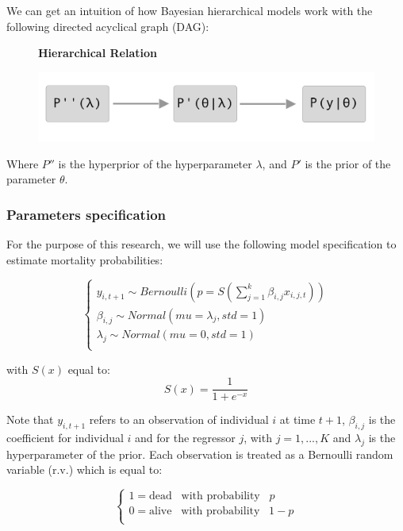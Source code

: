 We can get an intuition of how Bayesian hierarchical models work with the following directed acyclical graph (DAG):\\

\begin{figure}[H]
\centering \textbf{Hierarchical Relation} \par\medskip
\includegraphics[width=0.5\linewidth]{images/hierarchical_relation.png}
\end{figure}

Where $P''$ is the hyperprior of the hyperparameter $\lambda$, and $P'$ is the prior of the parameter $\theta$.

\subsubsection{Parameters specification}\label{hierarchical_model}

For the purpose of this research, we will use the following model specification to estimate mortality probabilities:

\begin{equation}
    \begin{cases}
     y_{i,t+1} \sim Bernoulli(p=S(\sum_{j=1}^{k}\beta_{i,j} x_{i,j,t}))  \\
 \beta_{i,j} \sim Normal(mu=\lambda_j, std=1) \\
\lambda_j \sim Normal(mu=0, std=1) \\
    \end{cases}
\end{equation}

with $S(x)$ equal to:
\begin{equation}
     S(x) = \frac{1}{1+e^{-x}}
\end{equation}

Note that $ y_{i,t+1} $ refers to an observation of individual $i$ at time $t+1$, $\beta_{i,j}$ is the coefficient for individual $i$ and for the regressor $j$, with $j = 1,..., K$ and $\lambda_j$ is the hyperparameter of the prior. 
Each observation is treated as a Bernoulli random variable (r.v.) which is equal to:

\begin{equation}
    \begin{cases}
    1 = \text{dead} \;\; \; \text{with probability} \;\;\; p\\
    0 = \text{alive}\;\; \; \text{with probability}\;\;\; 1-p\\
    \end{cases}
\end{equation}


